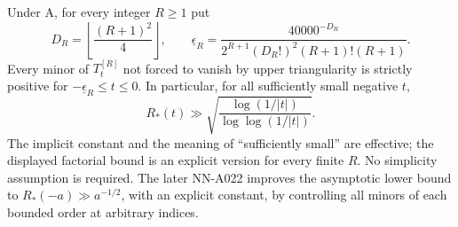 \begin{corollary}
Under A, for every integer $R\ge1$ put
\[
 D_R=\left\lfloor\frac{(R+1)^2}{4}\right\rfloor,
 \qquad
 \underline\epsilon_R=
 \frac{40000^{-D_R}}
 {2^{R+1}(D_R!)^2(R+1)!(R+1)}.
\]
Every minor of $T_t^{[R]}$ not forced to vanish by upper triangularity
is strictly positive for $-\underline\epsilon_R\le t\le0$.
In particular, for all sufficiently small negative $t$,
\[
 R_*(t)\gg
 \sqrt{\frac{\log(1/|t|)}{\log\log(1/|t|)}}.
\]
The implicit constant and the meaning of ``sufficiently small'' are
effective; the displayed factorial bound is an explicit version for
every finite $R$. No simplicity assumption is required.
The later NN-A022 improves the asymptotic lower bound to
$R_*(-a)\gg a^{-1/2}$, with an explicit constant, by controlling
all minors of each bounded order at arbitrary indices.
\end{corollary}
